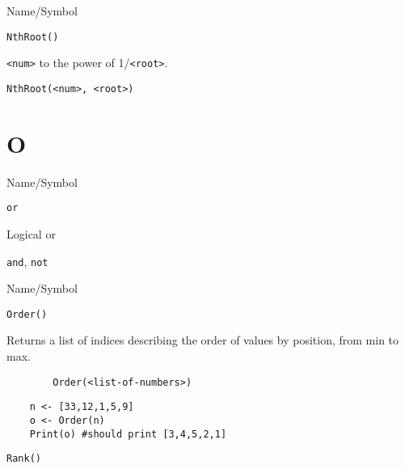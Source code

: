 \rl


\begin{desc}{Name/Symbol}
\item[Name/Symbol]	\verb+NthRoot()+

\item[Description]	\verb+<num>+ to the power of  1/\verb+<root>+.

\item[Usage]		
\begin{verbatim}
NthRoot(<num>, <root>)
\end{verbatim}

\item[Example]	

\item[See Also]	
\end{desc}

\rl
\section{O}
\rl


\begin{desc}{Name/Symbol}
\item[Name/Symbol]	\verb+or+                   

\item[Description]	Logical or

\item[Usage]		

\item[Example]	

\item[See Also]	\verb+and+, \verb+not+
\end{desc}

\rl






\begin{desc}{Name/Symbol}
\item[Name/Symbol]	\verb+Order()+

\item[Description]	Returns a list of indices describing the order of values by position, from min to max. 

\item[Usage]
\begin{verbatim}
		Order(<list-of-numbers>)
\end{verbatim}

\item[Example]	
\begin{verbatim}
	n <- [33,12,1,5,9]
  	o <- Order(n)
    Print(o) #should print [3,4,5,2,1]
\end{verbatim}

\item[See Also]	\verb+Rank()+
\end{desc}

